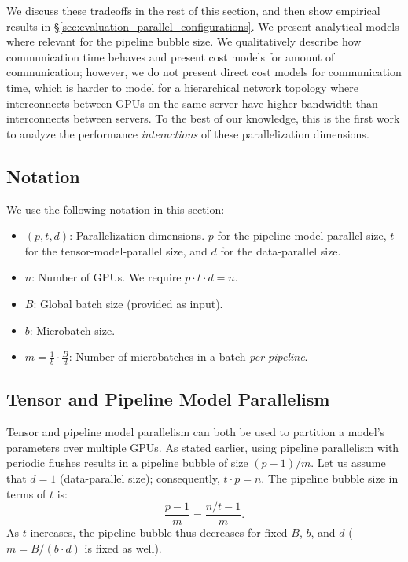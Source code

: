 \documentclass[sigconf,nonacm]{acmart}
\begin{document}
We discuss these tradeoffs in the rest of this section, and then show empirical results in \S\ref{sec:evaluation_parallel_configurations}. We present analytical models where relevant for the pipeline bubble size. We qualitatively describe how communication time behaves and present cost models for amount of communication; however, we do not present direct cost models for communication time, which is harder to model for a hierarchical network topology where interconnects between GPUs on the same server have higher bandwidth than interconnects between servers. To the best of our knowledge, this is the first work to analyze the performance \emph{interactions} of these parallelization dimensions.

\subsection{Notation}
We use the following notation in this section:
\begin{itemize}
    \item $(p, t, d)$: Parallelization dimensions. $p$ for the pipeline-model-parallel size, $t$ for the tensor-model-parallel size, and $d$ for the data-parallel size.
    \item $n$: Number of GPUs. We require $p \cdot t \cdot d = n$.
    \item $B$: Global batch size (provided as input).
    \item $b$: Microbatch size.
    \item $m=\frac{1}{b}\cdot\frac{B}{d}$: Number of microbatches in a batch \emph{per pipeline}.
\end{itemize}

\subsection{Tensor and Pipeline Model Parallelism}
Tensor and pipeline model parallelism can both be used to partition a model's parameters over multiple GPUs. As stated earlier, using pipeline parallelism with periodic flushes results in a pipeline bubble of size $(p-1) / m$. Let us assume that $d=1$ (data-parallel size); consequently, $t \cdot p = n$. The pipeline bubble size in terms of $t$ is:
$$\frac{p-1}{m} = \frac{n/t-1}{m}.$$
As $t$ increases, the pipeline bubble thus decreases for fixed $B$, $b$, and $d$ ($m = B / (b \cdot d)$ is fixed as well).
\end{document}
